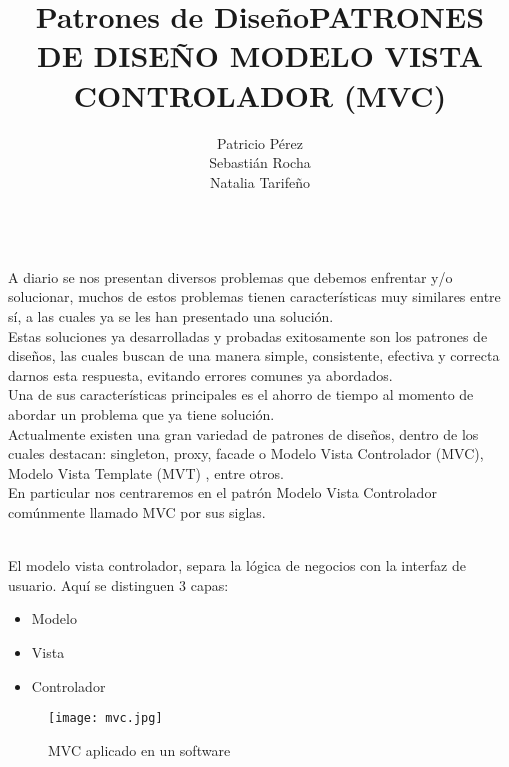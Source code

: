 \documentclass[a4paper,11pt]{report}
\begin{document}
\title{Patrones de Diseño}
\author{Patricio Pérez\\
        Sebastián Rocha\\
        Natalia Tarifeño}
\maketitle

\title {\textbf{PATRONES DE DISEÑO}}\\

A diario se nos presentan diversos problemas  que debemos enfrentar
y/o solucionar,
muchos de estos problemas tienen características muy similares entre sí, a las cuales ya se les han presentado una solución.\\
Estas soluciones ya desarrolladas y probadas exitosamente son los patrones de diseños,  las
cuales buscan de una manera simple, consistente, efectiva y correcta darnos esta respuesta, evitando errores comunes ya abordados.\\
Una de sus características principales es el ahorro de tiempo al momento de abordar un problema que ya tiene solución.\\
Actualmente existen una gran variedad de patrones de diseños, dentro
de los cuales destacan: singleton, proxy, facade o Modelo Vista Controlador (MVC), Modelo
Vista Template (MVT) , entre otros.\\
En particular nos centraremos en el patrón Modelo Vista Controlador comúnmente llamado MVC por sus siglas.\\

\title { \textbf{MODELO VISTA CONTROLADOR (MVC)}}\\

El modelo vista controlador, separa la lógica de negocios con la interfaz de usuario. Aquí se distinguen 3 capas:

\begin{itemize}
    \item{Modelo}
    \item{Vista}
    \item{Controlador}
\end{itemize}

\begin{figure}[!ht]
\begin{center}
  \texttt{[image: mvc.jpg]}
  \caption{MVC aplicado en un software}
\end{center}
\end{figure}
\end{document}
